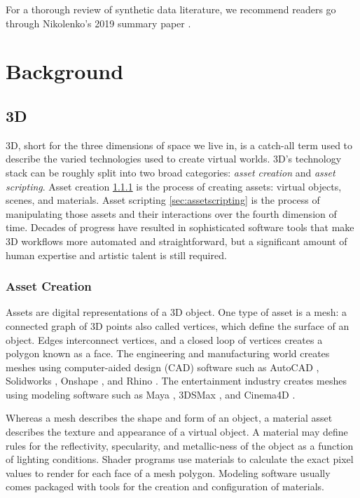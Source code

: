 \documentclass{article}
\begin{document}
For a thorough review of synthetic data literature, we recommend readers go through Nikolenko's 2019 summary paper \citep{nikolenko2019synthetic}.

\section{Background}
\label{sec:background}

\subsection{3D}
\label{sec:3d}

3D, short for the three dimensions of space we live in, is a catch-all term used to describe the varied technologies used to create virtual worlds. 3D’s technology stack can be roughly split into two broad categories: \emph{asset creation} and \emph{asset scripting}. Asset creation \ref{sec:assetcreation} is the process of creating assets: virtual objects, scenes, and materials. Asset scripting \ref{sec:assetscripting} is the process of manipulating those assets and their interactions over the fourth dimension of time. Decades of progress have resulted in sophisticated software tools that make 3D workflows more automated and straightforward, but a significant amount of human expertise and artistic talent is still required.

\subsubsection{Asset Creation}
\label{sec:assetcreation}

Assets are digital representations of a 3D object. One type of asset is a mesh: a connected graph of 3D points also called vertices, which define the surface of an object. Edges interconnect vertices, and a closed loop of vertices creates a polygon known as a face. The engineering and manufacturing world creates meshes using computer-aided design (CAD) software such as AutoCAD \citep{autocad}, Solidworks \citep{solidworks}, Onshape \citep{onshape}, and Rhino \citep{rhino}. The entertainment industry creates meshes using modeling software such as Maya \citep{maya}, 3DSMax \citep{3dsmax}, and Cinema4D \citep{cinema4d}.

Whereas a mesh describes the shape and form of an object, a material asset describes the texture and appearance of a virtual object. A material may define rules for the reflectivity, specularity, and metallic-ness of the object as a function of lighting conditions. Shader programs use materials to calculate the exact pixel values to render for each face of a mesh polygon. Modeling software usually comes packaged with tools for the creation and configuration of materials.
\end{document}
